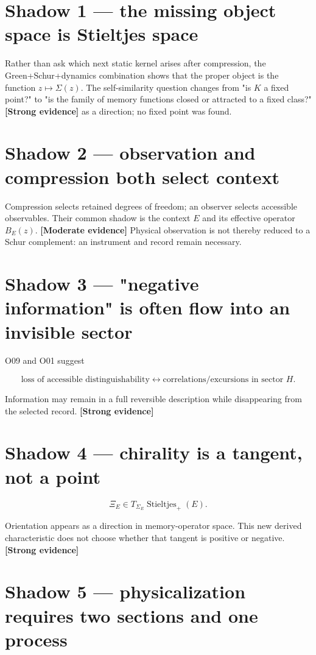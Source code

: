 \documentclass[11pt,a4paper,openany]{report}
\newcommand{\statusStrong}{\textcolor{finblue}{[Strong evidence]}}
\newcommand{\statusModerate}{\textcolor{finviolet}{[Moderate evidence]}}
\begin{document}
\section{Shadow 1 --- the missing object space is Stieltjes space}

Rather than ask which next static kernel arises after compression, the Green+Schur+dynamics combination shows that the proper object is the function \(z\mapsto\Sigma(z)\). The self-similarity question changes from "is \(K\) a fixed point?" to "is the family of memory functions closed or attracted to a fixed class?" \textbf{\statusStrong{}} as a direction; no fixed point was found.

\section{Shadow 2 --- observation and compression both select context}

Compression selects retained degrees of freedom; an observer selects accessible observables. Their common shadow is the context \(E\) and its effective operator \(B_E(z)\). \textbf{\statusModerate{}} Physical observation is not thereby reduced to a Schur complement: an instrument and record remain necessary.

\section{Shadow 3 --- "negative information" is often flow into an invisible sector}

O09 and O01 suggest

\[
\text{loss of accessible distinguishability}
\longleftrightarrow
\text{correlations/excursions in sector }H.
\]

Information may remain in a full reversible description while disappearing from the selected record. \textbf{\statusStrong{}}

\section{Shadow 4 --- chirality is a tangent, not a point}

\[
\Xi_E\in T_{\Sigma_E}\operatorname{Stieltjes}_+(E).
\]

Orientation appears as a direction in memory-operator space. This new derived characteristic does not choose whether that tangent is positive or negative. \textbf{\statusStrong{}}

\section{Shadow 5 --- physicalization requires two sections and one process}
\end{document}
